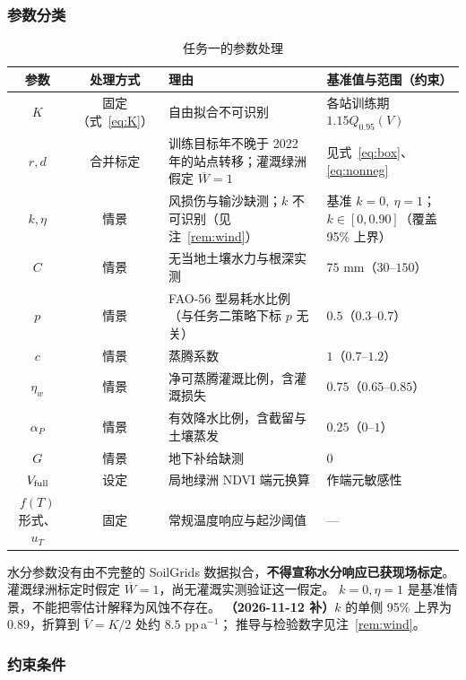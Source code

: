 \documentclass[11pt,a4paper]{ctexart}
\begin{document}
\subsubsection{参数分类}

\begin{table}[H]\centering\small
\begin{tabularx}{\textwidth}{|c|c|X|X|}
\toprule
参数 & 处理方式 & 理由 & 基准值与范围（约束） \\
\midrule
$K$ & 固定（式~\eqref{eq:K}） & 自由拟合不可识别 & 各站训练期 $1.15Q_{0.95}(V)$ \\
$r,d$ & 合并标定 & 训练目标年不晚于 2022 年的站点转移；灌溉绿洲假定 $\overline W=1$ & 见式~\eqref{eq:box}、\eqref{eq:nonneg} \\
$k,\eta$ & 情景 & 风损伤与输沙缺测；$k$ 不可识别（见注~\ref{rem:wind}） & 基准 $k=0,\ \eta=1$；$k\in[0,0.90]$（覆盖 95\% 上界） \\
$C$ & 情景 & 无当地土壤水力与根深实测 & $75$ mm（$30$--$150$） \\
$p$ & 情景 & FAO-56 型易耗水比例（与任务二策略下标 $p$ 无关） & $0.5$（$0.3$--$0.7$） \\
$c$ & 情景 & 蒸腾系数 & $1$（$0.7$--$1.2$） \\
$\eta_w$ & 情景 & 净可蒸腾灌溉比例，含灌溉损失 & $0.75$（$0.65$--$0.85$） \\
$\alpha_P$ & 情景 & 有效降水比例，含截留与土壤蒸发 & $0.25$（$0$--$1$） \\
$G$ & 情景 & 地下补给缺测 & $0$ \\
$V_{\rm full}$ & 设定 & 局地绿洲 NDVI 端元换算 & 作端元敏感性 \\
$f(T)$ 形式、$u_T$ & 固定 & 常规温度响应与起沙阈值 & — \\
\bottomrule
\end{tabularx}
\caption{任务一的参数处理}\label{tab:t1par}
\end{table}

水分参数没有由不完整的 SoilGrids 数据拟合，\textbf{不得宣称水分响应已获现场标定}。
灌溉绿洲标定时假定 $\overline W=1$，尚无灌溉实测验证这一假定。
$k=0,\eta=1$ 是基准情景，不能把零估计解释为风蚀不存在。
\textbf{（2026-11-12 补）}$k$ 的单侧 95\% 上界为 $0.89$，折算到 $\bar V=K/2$ 处约 $8.5$ pp\,a$^{-1}$；
推导与检验数字见注~\ref{rem:wind}。

\subsubsection{约束条件}
\end{document}
